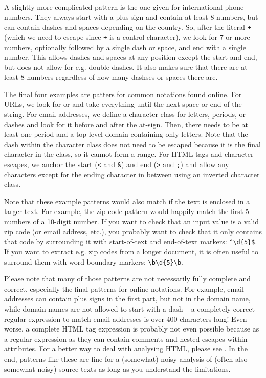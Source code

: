 A slightly more complicated pattern is the one given for international phone numbers.
They always start with a plus sign and contain at least 8 numbers, but can contain dashes and spaces depending on the country.
So, after the literal \verb|+| (which we need to escape since \verb|+| is a control character),
we look for 7 or more numbers, optionally followed by a single dash or space, and end with a single number.
This allows dashes and spaces at any position except the start and end, but does not allow for e.g. double dashes.
It also makes sure that there are at least 8 numbers regardless of how many dashses or spaces there are.

The final four examples are patters for common notations found online.  
For URLs, we look for  or  and take everything until the next space or end of the string.
For email addresses, we define a character class for letters, periods, or dashes and look for it before and after the at-sign.
Then, there needs to be at least one period and a top level domain containing only letters.
Note that the dash within the character class does not need to be escaped because it is the final character in the class, so it cannot form a range.
For HTML tags and character escapes, we anchor the start (\verb|<| and \verb|&|) and end (\verb|>| and \verb|;|) and allow any characters except for the ending character in between
using an inverted character class.

Note that these example patterns would also match if the text is enclosed in a larger text.
For example, the zip code pattern would happily match the first 5 numbers of a 10-digit number.
If you want to check that an input value is a valid zip code (or email address, etc.),
you probably want to check that it only contains that code by surrounding it with start-of-text and end-of-text markers: \verb|^\d{5}$|.
If you want to extract e.g. zip codes from a longer document, it is often useful to surround them with word boundary markers: \verb|\b\d{5}\b|.

Please note that many of those patterns are not necessarily fully complete and correct, especially the final patterns for online notations.
For example, email addresses can contain plus signs in the first part, but not in the domain name, while domain names are not allowed to start with a dash -- a completely correct regular expression to match email addresses is over 400 characters long!
Even worse, a complete HTML tag expression is probably not even possible because as a regular expression as they can contain comments and nested escapes within attributes.
For a better way to deal with analysing HTML, please see . In the end, patterns like these are fine for a (somewhat) noisy analysis of (often also somewhat noisy) source texts as long as you understand the limitations. 
        
